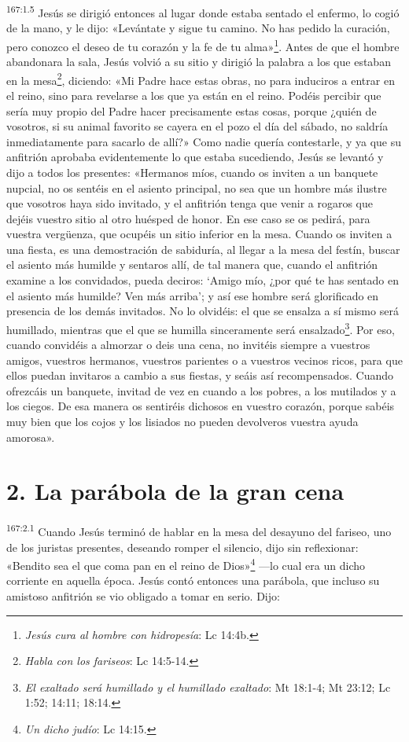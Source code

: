 \par
\textsuperscript{167:1.5} Jesús se dirigió entonces al lugar donde estaba sentado el enfermo, lo cogió de la mano, y le dijo: «Levántate y sigue tu camino. No has pedido la curación, pero conozco el deseo de tu corazón y la fe de tu alma»\footnote{\textit{Jesús cura al hombre con hidropesía}: Lc 14:4b.}. Antes de que el hombre abandonara la sala, Jesús volvió a su sitio y dirigió la palabra a los que estaban en la mesa\footnote{\textit{Habla con los fariseos}: Lc 14:5-14.}, diciendo: «Mi Padre hace estas obras, no para induciros a entrar en el reino, sino para revelarse a los que ya están en el reino. Podéis percibir que sería muy propio del Padre hacer precisamente estas cosas, porque ¿quién de vosotros, si su animal favorito se cayera en el pozo el día del sábado, no saldría inmediatamente para sacarlo de allí?» Como nadie quería contestarle, y ya que su anfitrión aprobaba evidentemente lo que estaba sucediendo, Jesús se levantó y dijo a todos los presentes: «Hermanos míos, cuando os inviten a un banquete nupcial, no os sentéis en el asiento principal, no sea que un hombre más ilustre que vosotros haya sido invitado, y el anfitrión tenga que venir a rogaros que dejéis vuestro sitio al otro huésped de honor. En ese caso se os pedirá, para vuestra verg\"uenza, que ocupéis un sitio inferior en la mesa. Cuando os inviten a una fiesta, es una demostración de sabiduría, al llegar a la mesa del festín, buscar el asiento más humilde y sentaros allí, de tal manera que, cuando el anfitrión examine a los convidados, pueda deciros: `Amigo mío, ¿por qué te has sentado en el asiento más humilde? Ven más arriba'; y así ese hombre será glorificado en presencia de los demás invitados. No lo olvidéis: el que se ensalza a sí mismo será humillado, mientras que el que se humilla sinceramente será ensalzado\footnote{\textit{El exaltado será humillado y el humillado exaltado}: Mt 18:1-4; Mt 23:12; Lc 1:52; 14:11; 18:14.}. Por eso, cuando convidéis a almorzar o deis una cena, no invitéis siempre a vuestros amigos, vuestros hermanos, vuestros parientes o a vuestros vecinos ricos, para que ellos puedan invitaros a cambio a sus fiestas, y seáis así recompensados. Cuando ofrezcáis un banquete, invitad de vez en cuando a los pobres, a los mutilados y a los ciegos. De esa manera os sentiréis dichosos en vuestro corazón, porque sabéis muy bien que los cojos y los lisiados no pueden devolveros vuestra ayuda amorosa».

\section*{2. La parábola de la gran cena}
\par
\textsuperscript{167:2.1} Cuando Jesús terminó de hablar en la mesa del desayuno del fariseo, uno de los juristas presentes, deseando romper el silencio, dijo sin reflexionar: «Bendito sea el que coma pan en el reino de Dios»\footnote{\textit{Un dicho judío}: Lc 14:15.} ---lo cual era un dicho corriente en aquella época. Jesús contó entonces una parábola, que incluso su amistoso anfitrión se vio obligado a tomar en serio. Dijo:

